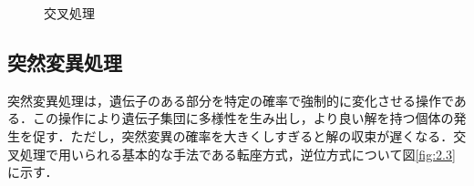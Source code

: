 \newpage

\begin{figure}[p]
\begin{center}





\caption{交叉処理}
\label{tb:cross}


\end{center}

\end{figure}



\clearpage



\subsection{突然変異処理}
\label{sec2.1.5}

突然変異処理は，遺伝子のある部分を特定の確率で強制的に変化させる操作である．この操作により遺伝子集団に多様性を生み出し，より良い解を持つ個体の発生を促す．ただし，突然変異の確率を大きくしすぎると解の収束が遅くなる．交叉処理で用いられる基本的な手法である転座方式，逆位方式について図\ref{fig:2.3}に示す．

